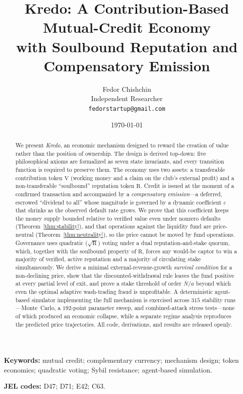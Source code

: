 \documentclass[11pt]{article}
\title{\textbf{Kredo}: A Contribution-Based Mutual-Credit Economy\\
with Soulbound Reputation and Compensatory Emission}
\author{Fedor Chishchin\\
\small Independent Researcher\\
\small \texttt{fedorstartup@gmail.com}}
\date{\today}
\theoremstyle{plain}
\theoremstyle{definition}
\theoremstyle{remark}
\newcommand{\V}{\mathrm{V}}
\newcommand{\R}{\mathrm{R}}
\begin{document}
\maketitle

\begin{abstract}
We present \emph{Kredo}, an economic mechanism designed to reward the creation of value rather than the position of ownership. The design is derived top-down: five philosophical axioms are formalized as seven state invariants, and every transition function is required to preserve them. The economy uses two assets: a transferable contribution token $\V$ (working money and a claim on the club's external profit) and a non-transferable ``soulbound'' reputation token $\R$. Credit is issued at the moment of a confirmed transaction and accompanied by a \emph{compensatory emission}---a deferred, escrowed ``dividend to all'' whose magnitude is governed by a dynamic coefficient $\varepsilon$ that shrinks as the observed default rate grows. We prove that this coefficient keeps the money supply bounded relative to verified value even under nonzero defaults (Theorem~\ref{thm:stability}), and that operations against the liquidity fund are price-neutral (Theorem~\ref{thm:neutrality}), so the price cannot be moved by fund operations. Governance uses quadratic ($\sqrt{\R}$) voting under a dual reputation-and-stake quorum, which, together with the soulbound property of $\R$, forces any would-be captor to win a majority of verified, active reputation and a majority of circulating stake simultaneously. We derive a minimal external-revenue-growth \emph{survival condition} for a non-declining price, show that the discounted-withdrawal rule leaves the fund positive at every partial level of exit, and prove a stake threshold of order $\bar N/a$ beyond which even the optimal adaptive wash-trading fraud is unprofitable. A deterministic agent-based simulator implementing the full mechanism is exercised across $315$ stability runs---Monte~Carlo, a $192$-point parameter sweep, and combined-attack stress tests---none of which produced an economic collapse, while a separate regime analysis reproduces the predicted price trajectories. All code, derivations, and results are released openly.
\end{abstract}

\noindent\textbf{Keywords:} mutual credit; complementary currency; mechanism design; token economics; quadratic voting; Sybil resistance; agent-based simulation.

\smallskip
\noindent\textbf{JEL codes:} D47; D71; E42; C63.
\end{document}
